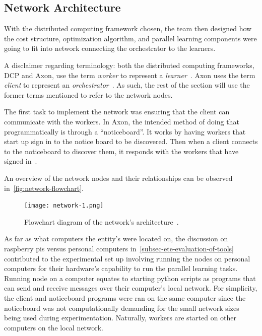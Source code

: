\documentclass[../mthe-493-final-project.tex]{subfiles}
\begin{document}
    \subsection{Network Architecture}
    \label{ssec:network-architecture}

    With the distributed computing framework chosen, the team then designed how the cost structure, optimization algorithm, and parallel learning components were going to fit into network connecting the orchestrator to the learners.

    A disclaimer regarding terminology: both the distributed computing frameworks, DCP and Axon, use the term \textit{worker} to represent a \textit{learner}~\cite{Mays_Axon}\cite{noauthor_worker_nodate}. Axon uses the term \textit{client} to represent an \textit{orchestrator}~\cite{Mays_Axon}. As such, the rest of the section will use the former terms mentioned to refer to the network nodes.

    The first task to implement the network was ensuring that the client can communicate with the workers. In Axon, the intended method of doing that programmatically is through a ``noticeboard''. It works by having workers that start up sign in to the notice board to be discovered. Then when a client connects to the noticeboard to discover them, it responds with the workers that have signed in~\cite{Mays_Axon}.

    An overview of the network nodes and their relationships can be observed in~\autoref{fig:network-flowchart}.
    
    \begin{figure}
        \texttt{[image: network-1.png]}
        \caption{Flowchart diagram of the network's architecture~\cite{group_a2_Optimization_Of_Data}.}
        \label{fig:network-flowchart}
    \end{figure}

    As far as what computers the entity's were located on, the discussion on raspberry pis versus personal computers in~\autoref{subsec-ete-evaluation-of-tools} contributed to the experimental set up involving running the nodes on personal computers for their hardware's capability to run the parallel learning tasks. Running node on a computer equates to starting python scripts as programs that can send and receive messages over their computer's local network. For simplicity, the client and noticeboard programs were ran on the same computer since the noticeboard was not computationally demanding for the small network sizes being used during experimentation. Naturally, workers are started on other computers on the local network.
\end{document}
